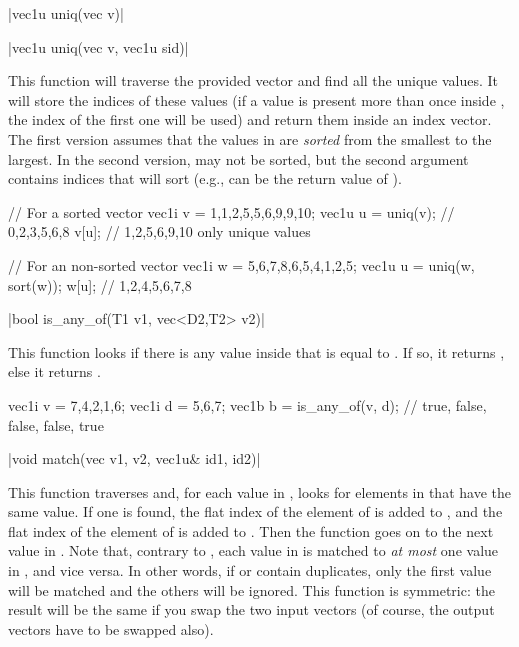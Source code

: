 \funcitem \cppinline|vec1u uniq(vec v)| 

\cppinline|vec1u uniq(vec v, vec1u sid)|

This function will traverse the provided vector  and find all the unique values. It will store the indices of these values (if a value is present more than once inside , the index of the first one will be used) and return them inside an index vector. The first version assumes that the values in  are \emph{sorted} from the smallest to the largest. In the second version,  may not be sorted, but the second argument  contains indices that will sort  (e.g.,  can be the return value of ).

\begin{example}
\begin{cppcode}
// For a sorted vector
vec1i v = {1,1,2,5,5,6,9,9,10};
vec1u u = uniq(v); // {0,2,3,5,6,8}
v[u]; // {1,2,5,6,9,10} only unique values

// For an non-sorted vector
vec1i w = {5,6,7,8,6,5,4,1,2,5};
vec1u u = uniq(w, sort(w));
w[u]; // {1,2,4,5,6,7,8}
\end{cppcode}
\end{example}

\funcitem \vectorfunc \cppinline|bool is_any_of(T1 v1, vec<D2,T2> v2)| 

This function looks if there is any value inside  that is equal to . If so, it returns \cpptrue, else it returns \cppfalse.

\begin{example}
\begin{cppcode}
vec1i v = {7,4,2,1,6};
vec1i d = {5,6,7};
vec1b b = is_any_of(v, d); // {true, false, false, false, true}
\end{cppcode}
\end{example}

\funcitem \cppinline|void match(vec v1, v2, vec1u& id1, id2)| 

This function traverses  and, for each value in , looks for elements in  that have the same value. If one is found, the flat index of the element of  is added to , and the flat index of the element of  is added to . Then the function goes on to the next value in . Note that, contrary to , each value in  is matched to \emph{at most} one value in , and vice versa. In other words, if  or  contain duplicates, only the first value will be matched and the others will be ignored. This function is symmetric: the result will be the same if you swap the two input vectors (of course, the output vectors have to be swapped also).

